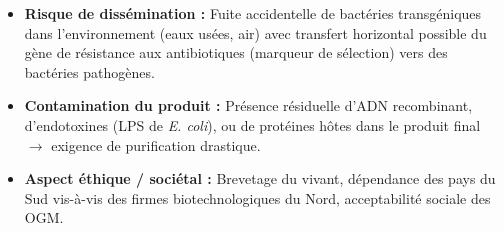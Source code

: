 \documentclass[11pt]{article}
\begin{document}
\begin{corrige}
\begin{enumerate}
\begin{itemize}
\item \textbf{Risque de dissémination :} Fuite accidentelle de bactéries transgéniques dans l'environnement (eaux usées, air) avec transfert horizontal possible du gène de résistance aux antibiotiques (marqueur de sélection) vers des bactéries pathogènes.
\item \textbf{Contamination du produit :} Présence résiduelle d'ADN recombinant, d'endotoxines (LPS de \emph{E. coli}), ou de protéines hôtes dans le produit final $\rightarrow$ exigence de purification drastique.
\item \textbf{Aspect éthique / sociétal :} Brevetage du vivant, dépendance des pays du Sud vis-à-vis des firmes biotechnologiques du Nord, acceptabilité sociale des OGM.
\end{itemize}
\end{enumerate}
\end{corrige}
\end{document}
